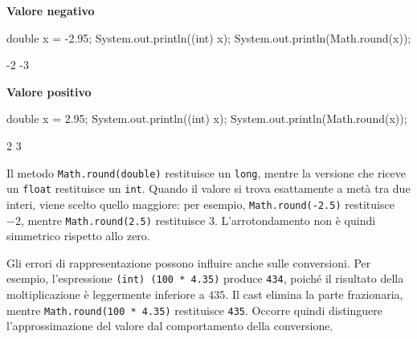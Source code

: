 \noindent
\begin{minipage}[t]{0.48\linewidth}
\vspace{0pt}
\textbf{Valore negativo}

\begin{unipdcode}[language=Java,
  basicstyle=\ttfamily\scriptsize,
  numbers=none,
  xleftmargin=1em,
  xrightmargin=1em,
  framexleftmargin=0.3em]
double x = -2.95;
System.out.println((int) x);
System.out.println(Math.round(x));
\end{unipdcode}

\begin{unipdterminal}[
  basicstyle=\ttfamily\scriptsize,
  numbers=none,
  xleftmargin=1em,
  xrightmargin=1em,
  framexleftmargin=0.3em]
-2
-3
\end{unipdterminal}
\end{minipage}%
\hfill
\begin{minipage}[t]{0.48\linewidth}
\vspace{0pt}
\textbf{Valore positivo}

\begin{unipdcode}[language=Java,
  basicstyle=\ttfamily\scriptsize,
  numbers=none,
  xleftmargin=1em,
  xrightmargin=1em,
  framexleftmargin=0.3em]
double x = 2.95;
System.out.println((int) x);
System.out.println(Math.round(x));
\end{unipdcode}

\begin{unipdterminal}[
  basicstyle=\ttfamily\scriptsize,
  numbers=none,
  xleftmargin=1em,
  xrightmargin=1em,
  framexleftmargin=0.3em]
2
3
\end{unipdterminal}
\end{minipage}

Il metodo \texttt{Math.round(double)} restituisce un
\texttt{long}, mentre la versione che riceve un
\texttt{float} restituisce un \texttt{int}.
Quando il valore si trova esattamente a metà tra due interi,
viene scelto quello maggiore: per esempio,
\texttt{Math.round(-2.5)} restituisce \(-2\), mentre
\texttt{Math.round(2.5)} restituisce \(3\).
L'arrotondamento non è quindi simmetrico rispetto allo zero.

Gli errori di rappresentazione possono influire anche sulle
conversioni. Per esempio, l'espressione
\texttt{(int) (100 * 4.35)} produce \texttt{434},
poiché il risultato della moltiplicazione è leggermente
inferiore a \(435\). Il cast elimina la parte frazionaria,
mentre \texttt{Math.round(100 * 4.35)} restituisce
\texttt{435}. Occorre quindi distinguere l'approssimazione
del valore dal comportamento della conversione.

